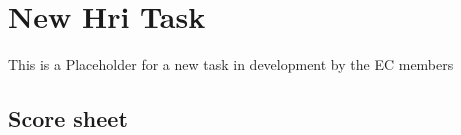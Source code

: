 \section{New Hri Task}\label{test:newhri}

This is a Placeholder for a new \HRI{} task in development by the \AtHome{} EC members

\subsection*{Score sheet}



